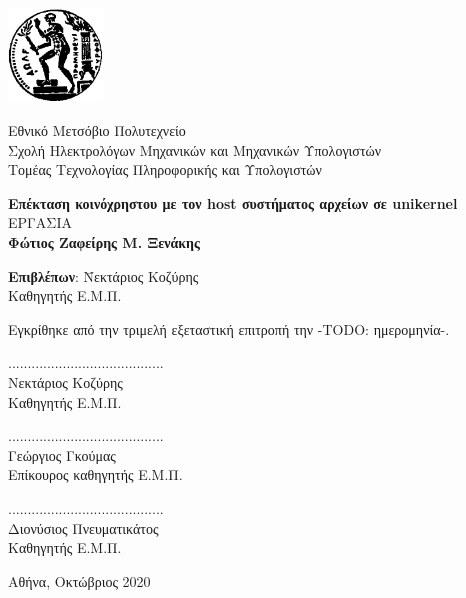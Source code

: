 \documentclass[12pt, a4paper, notitlepage]{report}
\newcommand{\en}[1]{\foreignlanguage{english}{#1}}
\newcommand{\blankpage}{\newpage\null\thispagestyle{empty}\newpage}
\newcommand{\host}{\en{host}}
\begin{document}
\blankpage

\vspace*{-8ex}
\noindent
\begin{minipage}{3.0cm}
	\includegraphics[height=2.5cm]{pyrforos}
\end{minipage}
\begin{minipage}{12.0cm}
	Εθνικό Μετσόβιο Πολυτεχνείο \\[3pt]
	Σχολή Ηλεκτρολόγων Μηχανικών και Μηχανικών Υπολογιστών \\[3pt]
	Τομέας Τεχνολογίας Πληροφορικής και Υπολογιστών
\end{minipage}
\vspace{14ex}
\begin{center}
	\large\textbf{Επέκταση κοινόχρηστου με τον \host{} συστήματος αρχείων σε \en{unikernel}} \\
	\vspace{14ex}
	 ΕΡΓΑΣΙΑ \\
	\vspace{1ex}
	\center\textbf{Φώτιος Ζαφείρης Μ. Ξενάκης}
\end{center}
\vfill
\begin{tabbing}
	\normalsize
	\textbf{Επιβλέπων}: \= Νεκτάριος Κοζύρης \\
						\> Καθηγητής Ε.Μ.Π.
\end{tabbing}
\vspace{4ex}
Εγκρίθηκε από την τριμελή εξεταστική επιτροπή την -TODO: ημερομηνία-.
\vspace{4ex}
\begin{center}
	\scriptsize
	\parbox[b]{0.3\textwidth} {
		\center
		........................................ \\
		Νεκτάριος Κοζύρης \\
		Καθηγητής Ε.Μ.Π.
	}
	\parbox[b]{0.3\textwidth} {
		\center
		........................................ \\
		Γεώργιος Γκούμας \\
		Επίκουρος καθηγητής Ε.Μ.Π.
	}
	\parbox[b]{0.3\textwidth} {
		\center
		........................................ \\
		Διονύσιος Πνευματικάτος \\
		Καθηγητής Ε.Μ.Π.
	}
\end{center}
\vspace{2ex}
\begin{center}
	\normalsize
	Αθήνα, Οκτώβριος 2020
\end{center}
\thispagestyle{empty}
\end{document}

